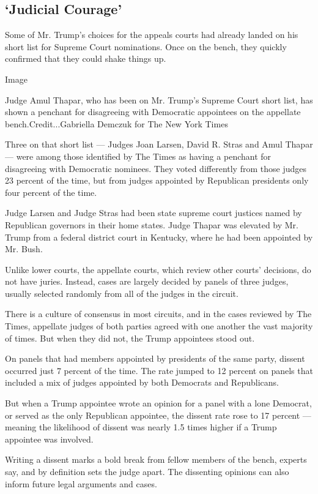 \hypertarget{judicial-courage}{%
\subsection{`Judicial Courage'}\label{judicial-courage}}

Some of Mr. Trump's choices for the appeals courts had already landed on
his short list for Supreme Court nominations. Once on the bench, they
quickly confirmed that they could shake things up.

Image

Judge Amul Thapar, who has been on Mr. Trump's Supreme Court short list,
has shown a penchant for disagreeing with Democratic appointees on the
appellate bench.Credit...Gabriella Demczuk for The New York Times

Three on that short list --- Judges Joan Larsen, David R. Stras and Amul
Thapar --- were among those identified by The Times as having a penchant
for disagreeing with Democratic nominees. They voted differently from
those judges 23 percent of the time, but from judges appointed by
Republican presidents only four percent of the time.

Judge Larsen and Judge Stras had been state supreme court justices named
by Republican governors in their home states. Judge Thapar was elevated
by Mr. Trump from a federal district court in Kentucky, where he had
been appointed by Mr. Bush.

Unlike lower courts, the appellate courts, which review other courts'
decisions, do not have juries. Instead, cases are largely decided by
panels of three judges, usually selected randomly from all of the judges
in the circuit.

There is a culture of consensus in most circuits, and in the cases
reviewed by The Times, appellate judges of both parties agreed with one
another the vast majority of times. But when they did not, the Trump
appointees stood out.

On panels that had members appointed by presidents of the same party,
dissent occurred just 7 percent of the time. The rate jumped to 12
percent on panels that included a mix of judges appointed by both
Democrats and Republicans.

But when a Trump appointee wrote an opinion for a panel with a lone
Democrat, or served as the only Republican appointee, the dissent rate
rose to 17 percent --- meaning the likelihood of dissent was nearly 1.5
times higher if a Trump appointee was involved.

Writing a dissent marks a bold break from fellow members of the bench,
experts say, and by definition sets the judge apart. The dissenting
opinions can also inform future legal arguments and cases.

